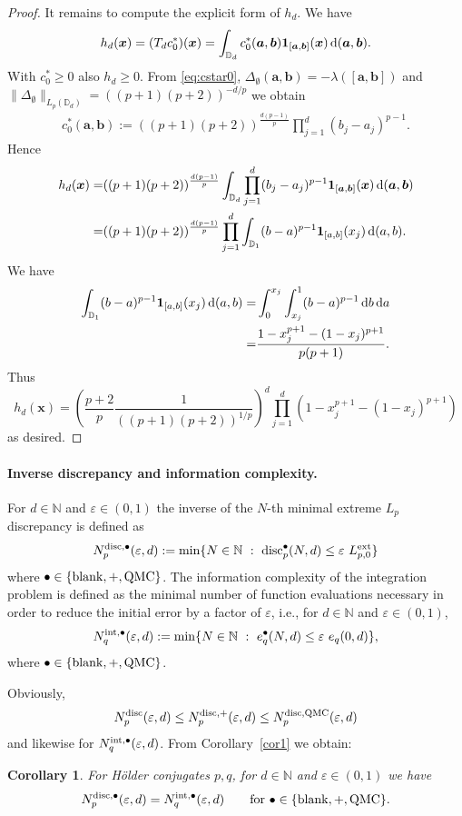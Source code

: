 \documentclass[12pt]{article}
\newtheorem{cor}{Corollary}
\theoremstyle{remark}
\theoremstyle{definition}
\newcommand{\N}{\mathbb{N}}
\newcommand{\D}{\mathbb{D}}
\newcommand{\ex}{{\rm ext}}
\newcommand{\qmc}{{\rm QMC}}
\newcommand{\rd}{\,{\rm d}}
\newcommand{\bsx}{{\boldsymbol x}}
\newcommand{\bsa}{{\boldsymbol a}}
\newcommand{\bsb}{{\boldsymbol b}}
\newcommand{\<}{\langle}
\renewcommand{\>}{\rangle}
\begin{document}
\begin{proof}
It remains to compute the explicit form of $h_d$. We have 
$$h_d(\bsx)=(T_d c_0^{\ast})(\bsx) =\int_{\D_d} c_0^{\ast}(\bsa,\bsb) {\bf 1}_{[\bsa,\bsb]}(\bsx) \rd (\bsa,\bsb).$$ With $c_0^{\ast}\ge 0$ also $h_d \ge 0$. From \eqref{eq:cstar0}, $\Delta_{\emptyset}(\bsa,\bsb)=-\lambda([\bsa,\bsb])$ and $\|\Delta_{\emptyset}\|_{L_p(\D_d)}=((p+1)(p+2))^{-d/p}$ we obtain 
\begin{align}\label{hd:expl}
c_0^{\ast}(\bsa,\bsb):=((p+1)(p+2))^{\frac{d (p-1)}{p}} \prod_{j=1}^d (b_j-a_j)^{p-1}.
\end{align}
Hence
\begin{align*}
h_d(\bsx) = & ((p+1)(p+2))^{\frac{d (p-1)}{p}}\int_{\D_d} \prod_{j=1}^d (b_j-a_j)^{p-1} {\bf 1}_{[\bsa,\bsb]}(\bsx) \rd (\bsa,\bsb)\\
= & ((p+1)(p+2))^{\frac{d (p-1)}{p}} \prod_{j=1}^d \int_{\D_1} (b-a)^{p-1} {\bf 1}_{[a,b]}(x_j) \rd(a,b).
\end{align*}
We have 
\begin{align*}
\int_{\D_1} (b-a)^{p-1} {\bf 1}_{[a,b]}(x_j) \rd(a,b) = & \int_0^{x_j} \int_{x_j}^1 (b-a)^{p-1} \rd b \rd a\\
= & \frac{1-x_j^{p+1}-(1-x_j)^{p+1}}{p(p+1)}.
\end{align*}
Thus $$h_d(\bsx)=\left(\frac{p+2}{p} \frac{1}{((p+1)(p+2))^{1/p}}\right)^d \prod_{j=1}^d \left(1-x_j^{p+1}-(1-x_j)^{p+1}\right)$$ as desired.
\end{proof}

\paragraph{Inverse discrepancy and information complexity.} For $d \in \N$ and $\varepsilon \in (0,1)$ the inverse of the $N$-th minimal extreme $L_p$ discrepancy is defined as $$N_p^{{\rm disc},\bullet}(\varepsilon,d):=\min\{N \in \N \ : \ {\rm disc}_p^{\bullet}(N,d) \le \varepsilon \ L_{p,0}^{\ex}\}$$ where $\bullet \in \{{\rm blank},+,\qmc\}$. The information complexity of the integration problem is defined as the minimal number of function evaluations necessary in order to reduce the initial error by a factor of $\varepsilon$, i.e., for $d \in \N$ and $\varepsilon \in (0,1)$,  
$$N^{{\rm int},\bullet}_q(\varepsilon,d):= \min\{N \in \N \ : \ e_q^{\bullet}(N,d) \le \varepsilon\ e_q(0,d)\},$$ where $\bullet \in \{{\rm blank},+,\qmc\}$.

Obviously, $$N_p^{{\rm disc}}(\varepsilon,d) \le N_p^{{\rm disc},+}(\varepsilon,d) \le N_p^{{\rm disc},\qmc}(\varepsilon,d)$$ and likewise for $N^{{\rm int},\bullet}_q(\varepsilon,d)$. From Corollary~\ref{cor1} we obtain:
\begin{cor}\label{cor2}
For H\"older conjugates $p,q$, for $d \in \N$ and $\varepsilon \in (0,1)$ we have $$N_p^{{\rm disc},\bullet}(\varepsilon,d) = N^{{\rm int},\bullet}_q(\varepsilon,d) \qquad \mbox{for  $\bullet \in \{{\rm blank},+,\qmc\}$.}$$
\end{cor}
\end{document}
